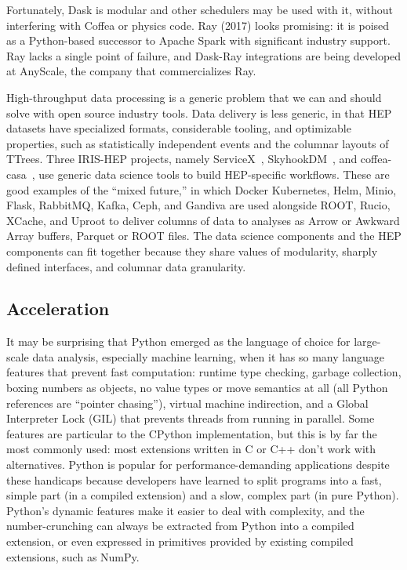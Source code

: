 \documentclass[12pt,a4paper]{article}
\begin{document}
Fortunately, Dask is modular and other schedulers may be used with it, without interfering with Coffea or physics code. Ray (2017) looks promising: it is poised as a Python-based successor to Apache Spark with significant industry support. Ray lacks a single point of failure, and Dask-Ray integrations are being developed at AnyScale, the company that commercializes Ray.

High-throughput data processing is a generic problem that we can and should solve with open source industry tools. Data delivery is less generic, in that HEP datasets have specialized formats, considerable tooling, and optimizable properties, such as statistically independent events and the columnar layouts of TTrees. Three IRIS-HEP projects, namely ServiceX~\cite{Galewsky:2020xig}, SkyhookDM~\cite{lefevre:login20}, and coffea-casa~\cite{Adamec:2021vkl}, use generic data science tools to build HEP-specific workflows. These are good examples of the ``mixed future,'' in which Docker Kubernetes, Helm, Minio, Flask, RabbitMQ, Kafka, Ceph, and Gandiva are used alongside ROOT, Rucio, XCache, and Uproot to deliver columns of data to analyses as Arrow or Awkward Array buffers, Parquet or ROOT files. The data science components and the HEP components can fit together because they share values of modularity, sharply defined interfaces, and columnar data granularity.

\subsection{Acceleration}

It may be surprising that Python emerged as the language of choice for large-scale data analysis, especially machine learning, when it has so many language features that prevent fast computation: runtime type checking, garbage collection, boxing numbers as objects, no value types or move semantics at all (all Python references are ``pointer chasing''), virtual machine indirection, and a Global Interpreter Lock (GIL) that prevents threads from running in parallel. Some features are particular to the CPython implementation, but this is by far the most commonly used: most extensions written in C or C++ don't work with alternatives. Python is popular for performance-demanding applications despite these handicaps because developers have learned to split programs into a fast, simple part (in a compiled extension) and a slow, complex part (in pure Python). Python's dynamic features make it easier to deal with complexity, and the number-crunching can always be extracted from Python into a compiled extension, or even expressed in primitives provided by existing compiled extensions, such as NumPy.
\end{document}

